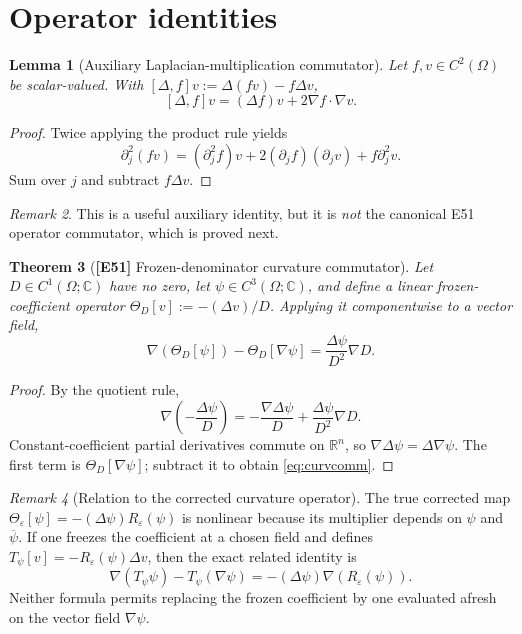 \documentclass[11pt,letterpaper]{article}
\newtheorem{theorem}{Theorem}[section]
\newtheorem{lemma}[theorem]{Lemma}
\theoremstyle{definition}
\theoremstyle{remark}
\newtheorem{remark}[theorem]{Remark}
\newcommand{\R}{\mathbb R}
\newcommand{\C}{\mathbb C}
\newcommand{\id}[1]{\textnormal{\textbf{[#1]}}}
\begin{document}
\section{Operator identities}
\begin{lemma}[Auxiliary Laplacian-multiplication commutator]\label{lem:lapcomm}
Let $f,v\in C^2(\Omega)$ be scalar-valued. With
$[\Delta,f]v:=\Delta(fv)-f\Delta v$,
\begin{equation}\label{eq:lapcomm}
\boxed{[\Delta,f]v=(\Delta f)v+2\nabla f\cdot\nabla v}.
\end{equation}
\end{lemma}
\begin{proof}
Twice applying the product rule yields
\begin{equation*}
\partial_j^2(fv)=(\partial_j^2f)v
+2(\partial_jf)(\partial_jv)+f\partial_j^2v.
\end{equation*}
Sum over $j$ and subtract $f\Delta v$.
\end{proof}
\begin{remark}
This is a useful auxiliary identity, but it is \emph{not} the canonical
E51 operator commutator, which is proved next.
\end{remark}

\begin{theorem}[\id{E51} Frozen-denominator curvature commutator]\label{thm:curvcomm}
Let $D\in C^1(\Omega;\C)$ have no zero, let
$\psi\in C^3(\Omega;\C)$, and define a \emph{linear frozen-coefficient}
operator $\Theta_D[v]:=-(\Delta v)/D$. Applying it componentwise to a
vector field,
\begin{equation}\label{eq:curvcomm}
\boxed{\nabla(\Theta_D[\psi])-\Theta_D[\nabla\psi]
=\frac{\Delta\psi}{D^2}\nabla D}.
\end{equation}
\end{theorem}
\begin{proof}
By the quotient rule,
\begin{equation*}
\nabla\left(-\frac{\Delta\psi}{D}\right)
=-\frac{\nabla\Delta\psi}{D}
+\frac{\Delta\psi}{D^2}\nabla D.
\end{equation*}
Constant-coefficient partial derivatives commute on $\R^n$,
so $\nabla\Delta\psi=\Delta\nabla\psi$. The first term is
$\Theta_D[\nabla\psi]$; subtract it to obtain \eqref{eq:curvcomm}.
\end{proof}
\begin{remark}[Relation to the corrected curvature operator]
The true corrected map $\Theta_\varepsilon[\psi]
=-(\Delta\psi)R_\varepsilon(\psi)$ is nonlinear because its
multiplier depends on $\psi$ and $\overline\psi$.
If one freezes the coefficient at a chosen field and defines
$T_\psi[v]=-R_\varepsilon(\psi)\Delta v$, then the exact related
identity is
\begin{equation*}
\nabla(T_\psi\psi)-T_\psi(\nabla\psi)
=-(\Delta\psi)\nabla(R_\varepsilon(\psi)).
\end{equation*}
Neither formula permits replacing the frozen coefficient by one
evaluated afresh on the vector field $\nabla\psi$.
\end{remark}
\end{document}
